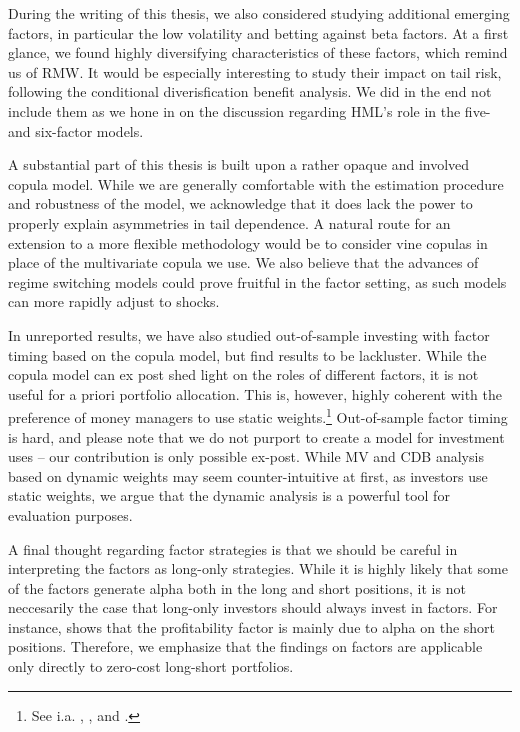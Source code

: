 During the writing of this thesis, we also considered studying additional emerging factors, in particular the low volatility and betting against beta factors. At a first glance, we found highly diversifying characteristics of these factors, which remind us of RMW. It would be especially interesting to study their impact on tail risk, following the conditional diverisfication benefit analysis. We did in the end not include them as we hone in on the discussion regarding HML's role in the five- and six-factor models.

A substantial part of this thesis is built upon a rather opaque and involved copula model. While we are generally comfortable with the estimation procedure and robustness of the model, we acknowledge that it does lack the power to properly explain asymmetries in tail dependence. A natural route for an extension to a more flexible methodology would be to consider vine copulas in place of the multivariate copula we use. We also believe that the advances of regime switching models could prove fruitful in the factor setting, as such models can more rapidly adjust to shocks.

In unreported results, we have also studied out-of-sample investing with factor timing based on the copula model, but find results to be lackluster. While the copula model can ex post shed light on the roles of different factors, it is not useful for a priori portfolio allocation. This is, however, highly coherent with the preference of money managers to use static weights.\footnote{See i.a. \textcite{AQRSiren}, \textcite{BlackRock}, \textcite{MSCI} and \textcite{Robeco}.} Out-of-sample factor timing is hard, and please note that we do not purport to create a model for investment uses -- our contribution is only possible ex-post. While MV and CDB analysis based on dynamic weights may seem counter-intuitive at first, as investors use static weights, we argue that the dynamic analysis is a powerful tool for evaluation purposes.

A final thought regarding factor strategies is that we should be careful in interpreting the factors as long-only strategies. While it is highly likely that some of the factors generate alpha both in the long and short positions, it is not neccesarily the case that long-only investors should always invest in factors. For instance, \textcite{Wang2013} shows that the profitability factor is mainly due to alpha on the short positions. Therefore, we emphasize that the findings on factors are applicable only directly to zero-cost long-short portfolios.